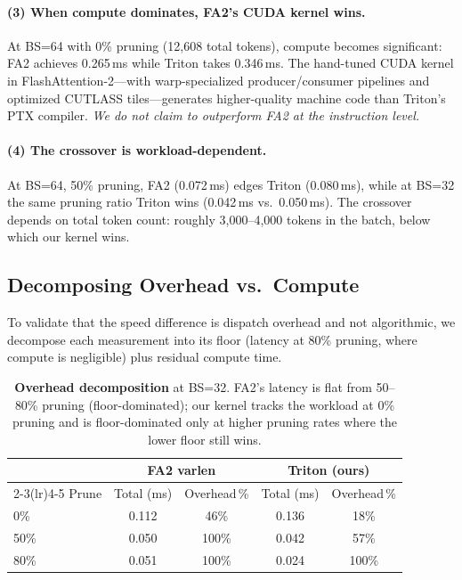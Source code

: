 \documentclass[conference]{IEEEtran}
\begin{document}
\paragraph{(3) When compute dominates, FA2's CUDA kernel wins.}
At BS=64 with 0\% pruning (12{,}608 total tokens), compute becomes
significant: FA2 achieves 0.265\,ms while Triton takes 0.346\,ms.
The hand-tuned CUDA kernel in FlashAttention-2---with warp-specialized
producer/consumer pipelines and optimized CUTLASS tiles---generates
higher-quality machine code than Triton's PTX compiler.
\emph{We do not claim to outperform FA2 at the instruction level.}

\paragraph{(4) The crossover is workload-dependent.}
At BS=64, 50\% pruning, FA2 (0.072\,ms) edges Triton (0.080\,ms),
while at BS=32 the same pruning ratio Triton wins (0.042\,ms vs.\
0.050\,ms).
The crossover depends on total token count: roughly 3{,}000--4{,}000
tokens in the batch, below which our kernel wins.

\subsection{Decomposing Overhead vs.\ Compute}\label{sec:decompose}

To validate that the speed difference is dispatch overhead and not
algorithmic, we decompose each measurement into its floor
(latency at 80\% pruning, where compute is negligible) plus residual
compute time.

\begin{table}[t]
\centering
\caption{%
  \textbf{Overhead decomposition} at BS=32.
  FA2's latency is flat from 50--80\% pruning (floor-dominated);
  our kernel tracks the workload at 0\% pruning and is floor-dominated
  only at higher pruning rates where the lower floor still wins.
}\label{tab:decompose}
\small\setlength{\tabcolsep}{5pt}
\begin{tabular}{@{}lcccc@{}}
\toprule
 & \multicolumn{2}{c}{FA2 varlen} & \multicolumn{2}{c}{Triton (ours)} \\
\cmidrule(lr){2-3}\cmidrule(lr){4-5}
Prune & Total (ms) & Overhead\,\% & Total (ms) & Overhead\,\% \\
\midrule
  0\% & 0.112 & 46\% & 0.136 & 18\% \\
 50\% & 0.050 & 100\% & 0.042 & 57\% \\
 80\% & 0.051 & 100\% & 0.024 & 100\% \\
\bottomrule
\end{tabular}
\end{table}
\end{document}
